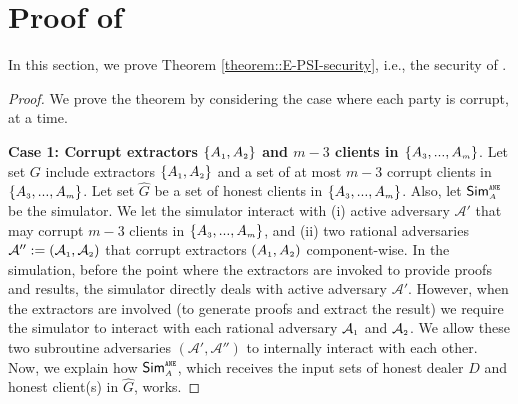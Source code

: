 

\vs
\section{Proof of \epsi}\label{sec::E-PSI-proof}



In this section, we prove Theorem \ref{theorem::E-PSI-security}, i.e., the security of \epsi. 


\begin{proof}
%
We prove the theorem by considering the case where each party is corrupt, at a time.





\noindent\textbf{Case 1: Corrupt extractors $\{A_{\scriptscriptstyle 1}, A_{\scriptscriptstyle 2}\}$ and $m-3$ clients in $\{  {  A}_{ \scriptscriptstyle {   3}}, ...,   {  A}_{ \scriptscriptstyle {   m}}\}$}.  Let set $G$ include extractors $\{A_{\scriptscriptstyle 1}, A_{\scriptscriptstyle 2}\}$ and a set of at most $m-3$ corrupt clients in $\{  {  A}_{ \scriptscriptstyle {   3}}, ...,   {  A}_{ \scriptscriptstyle {   m}}\}$. Let set $\hat G$ be a set of honest clients in  $\{  {  A}_{ \scriptscriptstyle {   3}}, ...,   {  A}_{ \scriptscriptstyle {   m}}\}$. Also, let $\mathsf{Sim}^{\scriptscriptstyle\mathtt{ANE}}_{\scriptscriptstyle A}$ be the simulator. We let the simulator  interact with (i) active adversary  $\mathcal{A}'$ that may corrupt $m-3$ clients in $\{  {  A}_{ \scriptscriptstyle {   3}}, ...,   {  A}_{ \scriptscriptstyle {   m}}\}$, and (ii) two rational adversaries  $\mathcal{A}'':=(\mathcal{A}_{\scriptscriptstyle 1}, \mathcal{A}_{\scriptscriptstyle 2})$ that corrupt extractors $(A_{\scriptscriptstyle 1},A_{\scriptscriptstyle 2})$ component-wise.  
%
%
In the simulation, before the point where the extractors are invoked to provide proofs and results, the simulator directly deals with active adversary  $\mathcal{A}'$. However, when the extractors are involved (to generate proofs and extract the result) we require the simulator to interact with each rational adversary $\mathcal{A}_{\scriptscriptstyle 1}$ and $\mathcal{A}_{\scriptscriptstyle 2}$.  We allow these two subroutine adversaries $(\mathcal{A}', \mathcal{A}'')$  to internally interact with each other.  Now, we explain how $\mathsf{Sim}^{\scriptscriptstyle \mathtt{ANE}}_{\scriptscriptstyle A}$, which receives the input sets of honest dealer $D$ and honest client(s) in $\hat G$,  works. 




\end{proof}

